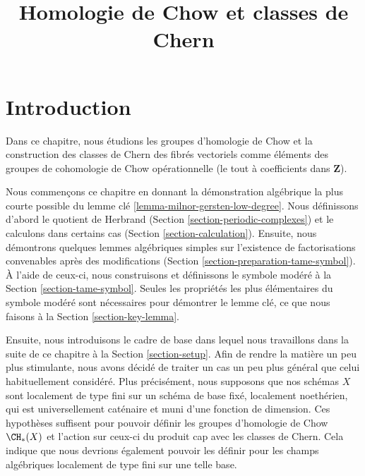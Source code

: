 

%


\title{Homologie de Chow et classes de Chern}

\maketitle

\label{section-phantom}


\tableofcontents


\section{Introduction}
\label{section-introduction}

\noindent
Dans ce chapitre, nous étudions les groupes d'homologie de Chow et la construction
des classes de Chern des fibrés vectoriels comme éléments des groupes
de cohomologie de Chow opérationnelle (le tout à coefficients dans $\mathbf{Z}$).

\medskip\noindent
Nous commençons ce chapitre en donnant la démonstration algébrique la plus courte
possible du lemme clé \ref{lemma-milnor-gersten-low-degree}.
Nous définissons d'abord le quotient de Herbrand
(Section \ref{section-periodic-complexes})
et le calculons dans certains cas
(Section \ref{section-calculation}).
Ensuite, nous démontrons quelques lemmes algébriques simples sur
l'existence de factorisations convenables après des modifications
(Section \ref{section-preparation-tame-symbol}).
À l'aide de ceux-ci, nous construisons et définissons le symbole modéré à la
Section \ref{section-tame-symbol}.
Seules les propriétés les plus élémentaires du symbole modéré
sont nécessaires pour démontrer le lemme clé, ce que nous faisons
à la Section \ref{section-key-lemma}.

\medskip\noindent
Ensuite, nous introduisons le cadre de base dans lequel nous travaillons dans la suite de ce
chapitre à la Section \ref{section-setup}. Afin de rendre la matière
un peu plus stimulante, nous avons décidé de traiter un cas un peu plus général
que celui habituellement considéré. Plus précisément, nous supposons que nos schémas $X$ sont localement
de type fini sur un schéma de base fixé, localement noethérien, qui est universellement
caténaire et muni d'une fonction de dimension. Ces hypothèses suffisent
pour pouvoir définir les groupes d'homologie de Chow $\CH_*(X)$ et l'action sur
ceux-ci du produit cap avec les classes de Chern. Cela indique que nous devrions
également pouvoir les définir pour les champs algébriques localement de type fini
sur une telle base.

